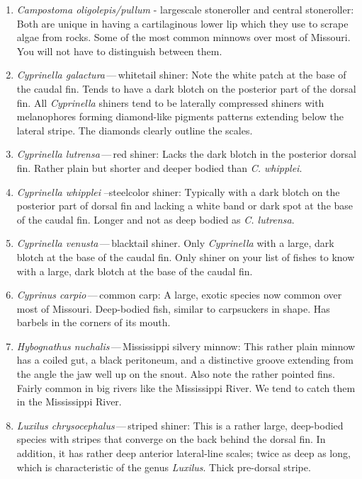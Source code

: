 \documentclass[11pt, hidelinks]{exam}
\begin{document}
\noindent\begin{enumerate}

\item \textit{Campostoma oligolepis/pullum} - largescale stoneroller and central stoneroller:  Both are unique in having a cartilaginous lower lip which they use to scrape algae from rocks.  Some of the most common minnows over most of Missouri. You will not have to distinguish between them.

\item \textit{Cyprinella galactura}\,—\,whitetail shiner: Note the white patch at the base of the caudal fin. Tends to have a dark blotch on the posterior part of the dorsal fin.  All \textit{Cyprinella} shiners tend to be laterally compressed shiners with melanophores forming diamond-like pigments patterns extending below the lateral stripe. The diamonds clearly outline the scales.

\item \textit{Cyprinella lutrensa}\,—\,red shiner: Lacks the dark blotch in the posterior dorsal fin. Rather plain but shorter and deeper bodied than \textit{C. whipplei}.

\item \textit{Cyprinella whipplei} –steelcolor shiner:  Typically with a dark blotch on the posterior part of dorsal fin and lacking a white band or dark spot at the base of the caudal fin.  Longer and not as deep bodied as \textit{C. lutrensa}.

\item \textit{Cyprinella venusta}\,—\,blacktail shiner. Only \textit{Cyprinella} with a large, dark blotch at the base of the caudal fin. Only shiner on your list of fishes to know with a large, dark blotch at the base of the caudal fin.

\item \textit{Cyprinus carpio}\,—\,common carp:  A large, exotic species now common over most of Missouri.  Deep-bodied fish, similar to carpsuckers in shape.  Has barbels in the corners of its mouth.

\item \textit{Hybognathus nuchalis}\,—\,Mississippi silvery minnow: This rather plain minnow has a coiled gut, a black peritoneum, and a distinctive groove extending from the angle the jaw well up on the snout.  Also note the rather pointed fins. Fairly common in big rivers like the Mississippi River. We tend to catch them in the Mississippi River.

\item \textit{Luxilus chrysocephalus}\,—\,striped shiner: This is a rather large, deep-bodied species with stripes that converge on the back behind the dorsal fin.  In addition, it has rather deep anterior lateral-line scales; twice as deep as long, which is characteristic of the genus \textit{Luxilus}. Thick pre-dorsal stripe.


\end{enumerate}
\end{document}
